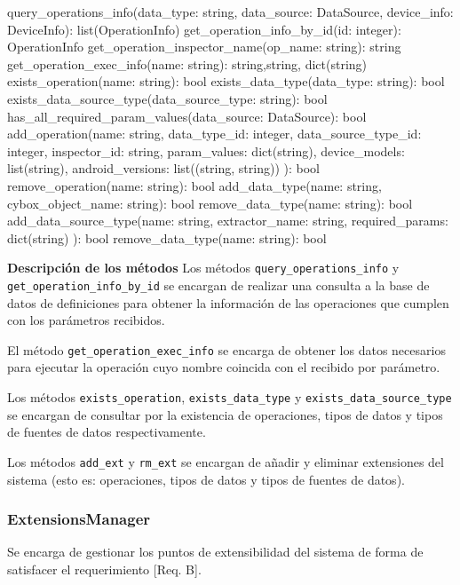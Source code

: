 \begin{python}[title=Interfaz DefinitionsDatabaseManager, captionpos=b]
query_operations_info(data_type: string, data_source: DataSource, 
                      device_info: DeviceInfo): list(OperationInfo)
get_operation_info_by_id(id: integer): OperationInfo
get_operation_inspector_name(op_name: string): string 
get_operation_exec_info(name: string): string,string, dict(string)
exists_operation(name: string): bool
exists_data_type(data_type: string): bool
exists_data_source_type(data_source_type: string): bool
has_all_required_param_values(data_source: DataSource): bool
add_operation(name: string, data_type_id: integer,
              data_source_type_id: integer,
              inspector_id: string,
              param_values: dict(string), 
              device_models: list(string),
              android_versions: list((string, string))
              ): bool
remove_operation(name: string): bool
add_data_type(name: string, cybox_object_name: string): bool
remove_data_type(name: string): bool
add_data_source_type(name: string,
                     extractor_name: string,
                     required_params: dict(string)
                     ): bool
remove_data_type(name: string): bool
\end{python}

\textbf{Descripción de los métodos} \newline
Los métodos \texttt{query\_operations\_info} y \texttt{get\_operation\_info\_by\_id} se encargan de realizar una consulta a la base de datos de definiciones para obtener la información de las operaciones que cumplen con los parámetros recibidos.

El método \texttt{get\_operation\_exec\_info} se encarga de obtener los datos necesarios para ejecutar la operación cuyo nombre coincida con el recibido por parámetro.

Los métodos \texttt{exists\_operation}, \texttt{exists\_data\_type} y \texttt{exists\-\_data\-\_source\-\_type} se encargan de consultar por la existencia de operaciones, tipos de datos y tipos de fuentes de datos respectivamente.

Los métodos \texttt{add\_ext} y \texttt{rm\_ext} se encargan de añadir y eliminar extensiones del sistema (esto es: operaciones, tipos de datos y tipos de fuentes de datos).

\subsubsection{ExtensionsManager}
Se encarga de gestionar los puntos de extensibilidad del sistema de forma de satisfacer el requerimiento [Req. B].
\newline

